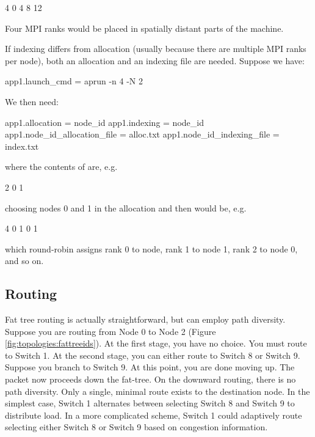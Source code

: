\begin{ViFile}
4
0
4
8
12
\end{ViFile}
Four MPI ranks would be placed in spatially distant parts of the machine.

If indexing differs from allocation (usually because there are multiple MPI ranks per node), both an allocation and an indexing file are needed.
Suppose we have:

\begin{ViFile}
app1.launch_cmd = aprun -n 4 -N 2
\end{ViFile}
We then need:

\begin{ViFile}
app1.allocation = node_id
app1.indexing = node_id
app1.node_id_allocation_file = alloc.txt
app1.node_id_indexing_file = index.txt
\end{ViFile}
where the contents of  are, e.g.

\begin{ViFile}
2
0
1
\end{ViFile}
choosing nodes 0 and 1 in the allocation and then  would be, e.g.

\begin{ViFile}
4
0
1
0
1
\end{ViFile}
which round-robin assigns rank 0 to node, rank 1 to node 1, rank 2 to node 0, and so on.

\subsection{Routing}
Fat tree routing is actually straightforward, but can employ path diversity.
Suppose you are routing from Node 0 to Node 2 (Figure \ref{fig:topologies:fattreeids}).
At the first stage, you have no choice.
You must route to Switch 1.
At the second stage, you can either route to Switch 8 or Switch 9.
Suppose you branch to Switch 9. 
At this point, you are done moving up.
The packet now proceeds down the fat-tree.
On the downward routing, there is no path diversity.
Only a single, minimal route exists to the destination node.
In the simplest case, Switch 1 alternates between selecting Switch 8 and Switch 9 to distribute load.
In a more complicated scheme, Switch 1 could adaptively route selecting either Switch 8 or Switch 9 based on congestion information.
